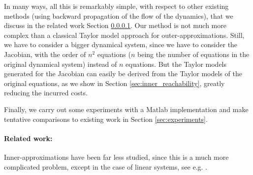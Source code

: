 \documentclass{sig-alternate-05-2015} %
\begin{document}
In many ways, all this is remarkably simple, with respect to other existing methods (using backward propagation
of the flow of the dynamics), that we discuss in the related work Section \ref{relatedwork}. Our method
is not much more complex than a classical Taylor model approach for outer-approximations. 
Still, we have to consider a bigger dynamical system, since we have to consider the Jacobian,
with the order of $n^2$ equations ($n$ being the number of equations in the original dynamical
system) instead of $n$ equations. But the Taylor models generated for the Jacobian can easily be derived from
the Taylor models of the original equations, as we show in Section \ref{sec:inner_reachability},
greatly reducing the incurred costs.  

Finally, we carry out some 
experiments with a Matlab implementation and make tentative comparisons to existing work in Section \ref{sec:experiments}. 




\paragraph{Related work:}
\label{relatedwork}

Inner-approximations have been far less studied, 
since this is a much more complicated problem, except in the case of linear systems, 
see e.g. \cite{LeGuernic09,GirardLinear06}.
\end{document}
